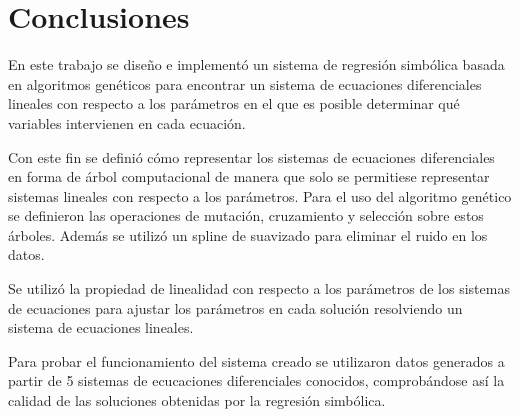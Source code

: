 \chapter*{Conclusiones}\label{chapter:conclusions}

En este trabajo se diseño e implementó un sistema de regresión simbólica basada en algoritmos genéticos para encontrar un sistema de ecuaciones diferenciales lineales con respecto a los parámetros en el que es posible determinar qué variables intervienen en cada ecuación.

Con este fin se definió cómo representar los sistemas de ecuaciones diferenciales en forma de árbol computacional de manera que solo se permitiese representar sistemas lineales con respecto a los parámetros. Para el uso del algoritmo genético se definieron las operaciones de mutación, cruzamiento y selección sobre estos árboles. Además se utilizó un spline de suavizado para eliminar el ruido en los datos.

Se utilizó la propiedad de linealidad con respecto a los parámetros de los sistemas de ecuaciones para ajustar los parámetros en cada solución resolviendo un sistema de ecuaciones lineales.

Para probar el funcionamiento del sistema creado se utilizaron datos generados a partir de 5 sistemas de ecucaciones diferenciales conocidos, comprobándose así la calidad de las soluciones obtenidas por la regresión simbólica.